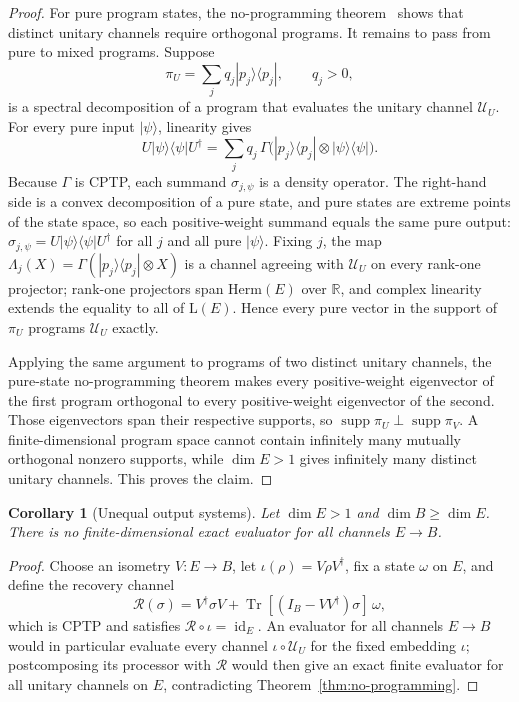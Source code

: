 \documentclass[11pt,a4paper]{article}
\newtheorem{corollary}[theorem]{Corollary}
\newcommand{\Lin}{\mathrm{L}}
\newcommand{\Herm}{\mathrm{Herm}}
\newcommand{\Tr}{\operatorname{Tr}}
\newcommand{\id}{\operatorname{id}}
\newcommand{\supp}{\operatorname{supp}}
\begin{document}
\begin{proof}
For pure program states, the no-programming theorem~\cite{NielsenChuang1997} shows that distinct unitary channels require orthogonal programs. It remains to pass from pure to mixed programs. Suppose
\[
\pi_U=\sum_jq_j|p_j\rangle\langle p_j|,\qquad q_j>0,
\]
is a spectral decomposition of a program that evaluates the unitary channel $\mathcal U_U$. For every pure input $|\psi\rangle$, linearity gives
\[
U|\psi\rangle\langle\psi|U^\dagger
=\sum_jq_j\,\Gamma\big(|p_j\rangle\langle p_j|\otimes|\psi\rangle\langle\psi|\big).
\]
Because $\Gamma$ is CPTP, each summand $\sigma_{j,\psi}$ is a density operator. The right-hand side is a convex decomposition of a pure state, and pure states are extreme points of the state space, so each positive-weight summand equals the same pure output: $\sigma_{j,\psi}=U|\psi\rangle\langle\psi|U^\dagger$ for all $j$ and all pure $|\psi\rangle$. Fixing $j$, the map $\Lambda_j(X)=\Gamma(|p_j\rangle\langle p_j|\otimes X)$ is a channel agreeing with $\mathcal U_U$ on every rank-one projector; rank-one projectors span $\Herm(E)$ over $\mathbb R$, and complex linearity extends the equality to all of $\Lin(E)$. Hence every pure vector in the support of $\pi_U$ programs $\mathcal U_U$ exactly.

Applying the same argument to programs of two distinct unitary channels, the pure-state no-programming theorem makes every positive-weight eigenvector of the first program orthogonal to every positive-weight eigenvector of the second. Those eigenvectors span their respective supports, so $\supp\pi_U\perp\supp\pi_V$. A finite-dimensional program space cannot contain infinitely many mutually orthogonal nonzero supports, while $\dim E>1$ gives infinitely many distinct unitary channels. This proves the claim.
\end{proof}

\begin{corollary}[Unequal output systems]
\label{cor:unequal}
Let $\dim E>1$ and $\dim B\ge\dim E$. There is no finite-dimensional exact evaluator for all channels $E\to B$.
\end{corollary}

\begin{proof}
Choose an isometry $V:E\to B$, let $\iota(\rho)=V\rho V^\dagger$, fix a state $\omega$ on $E$, and define the recovery channel
\[
\mathcal R(\sigma)=V^\dagger\sigma V+\Tr[(I_B-VV^\dagger)\sigma]\,\omega,
\]
which is CPTP and satisfies $\mathcal R\circ\iota=\id_E$. An evaluator for all channels $E\to B$ would in particular evaluate every channel $\iota\circ\mathcal U_U$ for the fixed embedding $\iota$; postcomposing its processor with $\mathcal R$ would then give an exact finite evaluator for all unitary channels on $E$, contradicting Theorem~\ref{thm:no-programming}.
\end{proof}
\end{document}
